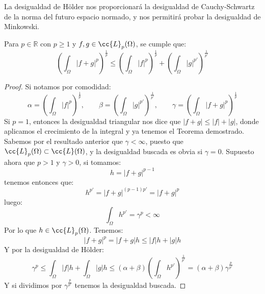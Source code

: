 \noindent
La desigualdad de Hölder nos proporcionará la desigualdad de Cauchy-Schwartz de la norma del futuro espacio normado, y nos permitirá probar la desigualdad de Minkowski.

\begin{teo}
    Para $p\in \mathbb{R}$ con $p\geq 1$ y $f,g\in \cc{L}_p(\Omega)$, se cumple que:
    \begin{equation*}
        {\left(\int_\Omega |f+g|^p\right)}^{\frac{1}{p}} \leq {\left(\int_\Omega |f|^p\right)}^{\frac{1}{p}} + {\left(\int_\Omega |g|^{p'}\right)}^{\frac{1}{p'}}
    \end{equation*}
    \begin{proof}
        Si notamos por comodidad:
        \begin{equation*}
            \alpha = {\left(\int_\Omega |f|^p\right)}^{\frac{1}{p}},  \qquad \beta ={\left(\int_\Omega |g|^{p'}\right)}^{\frac{1}{p'}}, \qquad \gamma = {\left(\int_\Omega |f+g|^p\right)}^{\frac{1}{p}} 
        \end{equation*}
        Si $p=1$, entonces la desigualdad triangular nos dice que $|f+g| \leq |f| + |g|$, donde aplicamos el crecimiento de la integral y ya tenemos el Teorema demostrado. Sabemos por el resultado anterior que $\gamma<\infty$, puesto que $\cc{L}_p(\Omega)\subset \cc{L}(\Omega)$, y la desigualdad buscada es obvia si $\gamma = 0$.  Supuesto ahora que $p>1$ y $\gamma>0$, si tomamos:
        \begin{equation*}
            h = |f+g|^{p-1}
        \end{equation*}
        tenemos entonces que:
        \begin{equation*}
            h^{p'} = |f+g|^{(p-1)p'} = |f+g|^p
        \end{equation*}
        luego:
        \begin{equation*}
            \int_\Omega h^{p'} = \gamma^p < \infty
        \end{equation*}
        Por lo que $h\in \cc{L}_p(\Omega)$. Tenemos:
        \begin{equation*}
            |f+g|^p = |f+g|h \leq |f| h + |g| h
        \end{equation*}
        Y por la desigualdad de Hölder:
        \begin{equation*}
            \gamma^p \leq \int_\Omega |f| h + \int_\Omega |g|h \leq (\alpha+\beta){\left(\int_\Omega h^{p'}\right)}^{\frac{1}{p'}} = (\alpha + \beta)\gamma^{\frac{p}{p'}}
        \end{equation*}
        Y si dividimos por $\gamma^{\frac{p}{p'}}$ tenemos la desigualdad buscada.
    \end{proof}
\end{teo}

